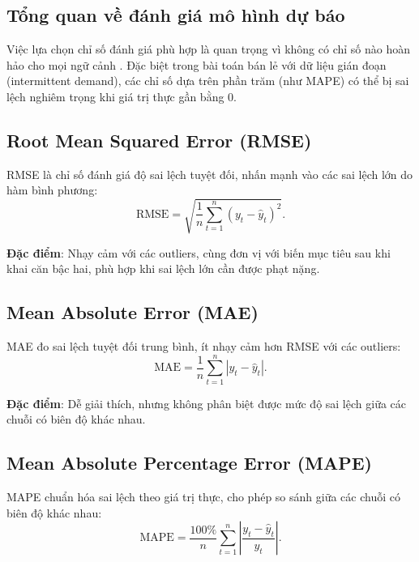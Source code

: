 \subsection{Tổng quan về đánh giá mô hình dự báo}
\label{subsec:danh_gia_tong_quan}

Việc lựa chọn chỉ số đánh giá phù hợp là quan trọng vì không có chỉ số nào hoàn hảo cho mọi ngữ cảnh \citep{hyndman2006another}. Đặc biệt trong bài toán bán lẻ với dữ liệu gián đoạn (intermittent demand), các chỉ số dựa trên phần trăm (như MAPE) có thể bị sai lệch nghiêm trọng khi giá trị thực gần bằng 0.

\subsection{Root Mean Squared Error (RMSE)}
\label{subsec:rmse}

RMSE là chỉ số đánh giá độ sai lệch tuyệt đối, nhấn mạnh vào các sai lệch lớn do hàm bình phương:
\begin{equation}
    \text{RMSE} = \sqrt{\frac{1}{n}\sum_{t=1}^{n}(y_t - \hat{y}_t)^2}.
    \label{eq:rmse}
\end{equation}

\textbf{Đặc điểm}: Nhạy cảm với các outliers, cùng đơn vị với biến mục tiêu sau khi khai căn bậc hai, phù hợp khi sai lệch lớn cần được phạt nặng.

\subsection{Mean Absolute Error (MAE)}
\label{subsec:mae}

MAE đo sai lệch tuyệt đối trung bình, ít nhạy cảm hơn RMSE với các outliers:
\begin{equation}
    \text{MAE} = \frac{1}{n}\sum_{t=1}^{n}|y_t - \hat{y}_t|.
    \label{eq:mae}
\end{equation}

\textbf{Đặc điểm}: Dễ giải thích, nhưng không phân biệt được mức độ sai lệch giữa các chuỗi có biên độ khác nhau.

\subsection{Mean Absolute Percentage Error (MAPE)}
\label{subsec:mape}

MAPE chuẩn hóa sai lệch theo giá trị thực, cho phép so sánh giữa các chuỗi có biên độ khác nhau:
\begin{equation}
    \text{MAPE} = \frac{100\%}{n}\sum_{t=1}^{n}\left|\frac{y_t - \hat{y}_t}{y_t}\right|.
    \label{eq:mape}
\end{equation}


